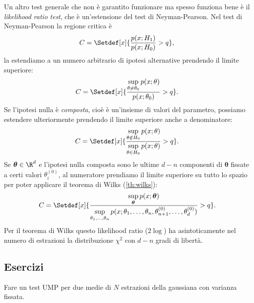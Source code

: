 Un altro test generale che non è garantito funzionare ma spesso funziona bene
è il \emph{likelihood ratio test}, che è un'estensione del test di Neyman-Pearson.
Nel test di Neyman-Pearson la regione critica è
\begin{equation*}
	C = \Setdef[x]{\frac{p(x;H_1)}{p(x;H_0)} > q},
\end{equation*}
la estendiamo a un numero arbitrario di ipotesi alternative prendendo il limite superiore:
\begin{equation*}
	C = \Setdef[x]{\frac {\sup\limits_{\theta\neq\theta_0} p(x;\theta)} {p(x;\theta_0)} > q}.
\end{equation*}
Se l'ipotesi nulla è \emph{composta},
cioè è un'insieme di valori del parametro,
possiamo estendere ulteriormente prendendo il limite superiore anche a denominatore:
\begin{equation*}
	C = \Setdef[x]{\frac {\sup\limits_{\theta\not\in H_0} p(x;\theta)} {\sup\limits_{\theta\in H_0} p(x;\theta)} > q}.
\end{equation*}
Se $\boldsymbol\theta\in\R^d$
e l'ipotesi nulla composta sono le ultime $d-n$ componenti di $\boldsymbol\theta$
fissate a certi valori $\theta_i^{(0)}$,
al numeratore prendiamo il limite superiore su tutto lo spazio
per poter applicare il teorema di Wilks (\autoref{th:wilks}):
\begin{equation*}
	C = \Setdef[x]{\frac
	{\sup\limits_{\boldsymbol\theta} p(x;\boldsymbol\theta)}
	{\sup\limits_{\theta_1,\dotsc,\theta_n} p(x;\theta_1,\dotsc,\theta_n,\theta_{n+1}^{(0)},\dotsc,\theta_d^{(0)})} > q}.
\end{equation*}
Per il teorema di Wilks
questo likelihood ratio ($2\log$) ha asintoticamente nel numero di estrazioni
la distribuzione $\chi^2$ con $d-n$ gradi di libertà.


\subsection{Esercizi}

\begin{exercise}
	Fare un test UMP per due medie di $N$ estrazioni della gaussiana con varianza fissata.
\end{exercise}

